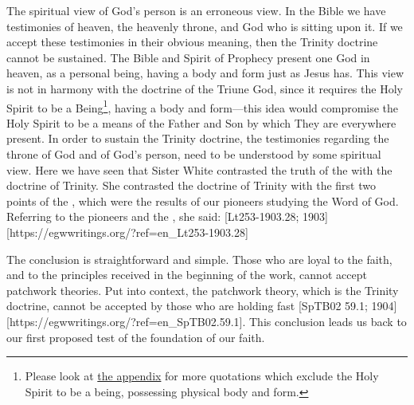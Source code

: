 The spiritual view of God’s person is an erroneous view. In the Bible we have testimonies of heaven, the heavenly throne, and God who is sitting upon it. If we accept these testimonies in their obvious meaning, then the Trinity doctrine cannot be sustained. The Bible and Spirit of Prophecy present one God in heaven, as a personal being, having a body and form just as Jesus has. This view is not in harmony with the doctrine of the Triune God, since it requires the Holy Spirit to be a Being\footnote{Please look at \hyperref[appendix:unauthenticated-reports]{the appendix} for more quotations which exclude the Holy Spirit to be a being, possessing physical body and form.}, having a body and form—this idea would compromise the Holy Spirit to be a means of the Father and Son by which They are everywhere present. In order to sustain the Trinity doctrine, the testimonies regarding the throne of God and of God’s person, need to be understood by some spiritual view. Here we have seen that Sister White contrasted the truth of the  with the doctrine of Trinity. She contrasted the doctrine of Trinity with the first two points of the , which were the results of our pioneers studying the Word of God. Referring to the pioneers and the , she said: [Lt253-1903.28; 1903][https://egwwritings.org/?ref=en\_Lt253-1903.28]

The conclusion is straightforward and simple. Those who are loyal to the faith, and to the principles received in the beginning of the work, cannot accept patchwork theories. Put into context, the patchwork theory, which is the Trinity doctrine, cannot be accepted by those who are holding fast [SpTB02 59.1; 1904][https://egwwritings.org/?ref=en\_SpTB02.59.1]. This conclusion leads us back to our first proposed test of the foundation of our faith.

